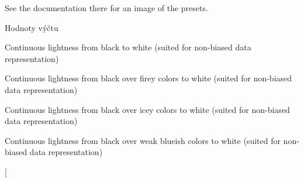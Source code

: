 See the documentation there for an image of the presets. \begin{Desc}
\item[Hodnoty výčtu]\par
\begin{description}
\item[{\em 
\hypertarget{classQCPColorGradient_aed6569828fee337023670272910c9072add11ae369a86f3b1b6205ec72e5021fb}{}gp\+Grayscale\label{classQCPColorGradient_aed6569828fee337023670272910c9072add11ae369a86f3b1b6205ec72e5021fb}
}]Continuous lightness from black to white (suited for non-\/biased data representation) \item[{\em 
\hypertarget{classQCPColorGradient_aed6569828fee337023670272910c9072a4f42e534cf6cff5a29a5388094d099b5}{}gp\+Hot\label{classQCPColorGradient_aed6569828fee337023670272910c9072a4f42e534cf6cff5a29a5388094d099b5}
}]Continuous lightness from black over firey colors to white (suited for non-\/biased data representation) \item[{\em 
\hypertarget{classQCPColorGradient_aed6569828fee337023670272910c9072aec8c001f62c0d5cb853db5fd85309557}{}gp\+Cold\label{classQCPColorGradient_aed6569828fee337023670272910c9072aec8c001f62c0d5cb853db5fd85309557}
}]Continuous lightness from black over icey colors to white (suited for non-\/biased data representation) \item[{\em 
\hypertarget{classQCPColorGradient_aed6569828fee337023670272910c9072a1bb89351b6def7d220973443fe059c62}{}gp\+Night\label{classQCPColorGradient_aed6569828fee337023670272910c9072a1bb89351b6def7d220973443fe059c62}
}]Continuous lightness from black over weak blueish colors to white (suited for non-\/biased data representation) \item[{\em 
}
\end{description}
\end{Desc}
